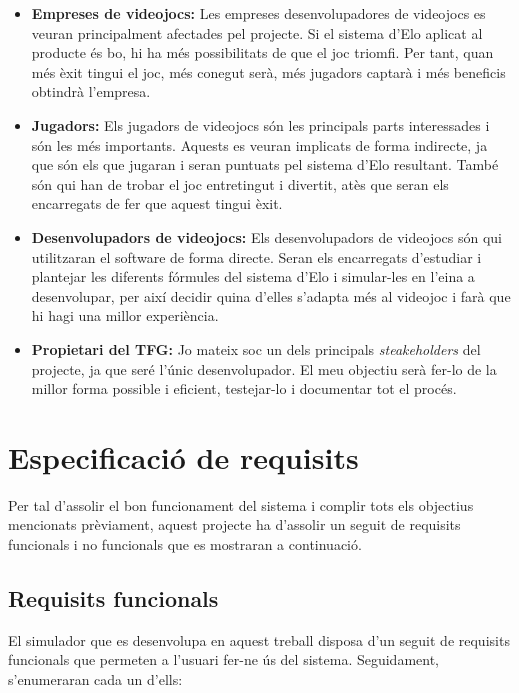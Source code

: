 \documentclass[a4paper]{article}
\begin{document}
\begin{itemize}
    \item \textbf{Empreses de videojocs:} Les empreses desenvolupadores de videojocs es veuran principalment afectades pel projecte. Si el sistema d'Elo aplicat al producte és bo, hi ha més possibilitats de que el joc triomfi. Per tant, quan més èxit tingui el joc, més conegut serà, més jugadors captarà i més beneficis obtindrà l'empresa.
    
    \item \textbf{Jugadors:} Els jugadors de videojocs són les principals parts interessades i són les més importants. Aquests es veuran implicats de forma indirecte, ja que són els que jugaran i seran puntuats pel sistema d'Elo resultant. També són qui han de trobar el joc entretingut i divertit, atès que seran els encarregats de fer que aquest tingui èxit. 
    
    \item \textbf{Desenvolupadors de videojocs:} Els desenvolupadors de videojocs són qui utilitzaran el software de forma directe. Seran els encarregats d'estudiar i plantejar les diferents fórmules del sistema d'Elo i simular-les en l'eina a desenvolupar, per així decidir quina d'elles s'adapta més al videojoc i farà que hi hagi una millor experiència.
    
    \item \textbf{Propietari del TFG:} Jo mateix soc un dels principals \textit{steakeholders} del projecte, ja que seré l'únic desenvolupador. El meu objectiu serà fer-lo de la millor forma possible i eficient, testejar-lo i documentar tot el procés.
    
\end{itemize}

\newpage
\section{Especificació de requisits}
Per tal d'assolir el bon funcionament del sistema i complir tots els objectius mencionats prèviament, aquest projecte ha d'assolir un seguit de requisits funcionals i no funcionals que es mostraran a continuació.

\subsection{Requisits funcionals}
El simulador que es desenvolupa en aquest treball disposa d'un seguit de requisits funcionals que permeten a l'usuari fer-ne ús del sistema. Seguidament, s'enumeraran cada un d'ells:
\end{document}

